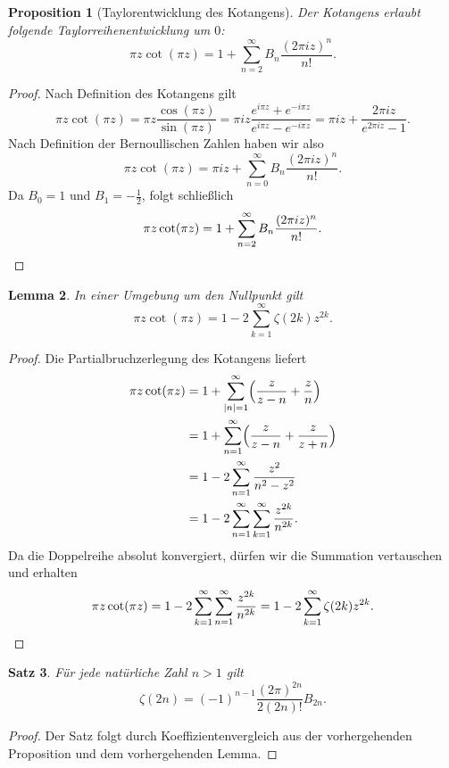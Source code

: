 \documentclass[a4paper,twoside,openright]{report}
\newtheorem{thm}{Satz}[chapter]
\newtheorem{prop}[thm]{Proposition}
\newtheorem{lem}[thm]{Lemma}
\theoremstyle{definition}
\theoremstyle{remark}
\begin{document}
\begin{prop}[Taylorentwicklung des Kotangens]
  Der Kotangens erlaubt folgende Taylorreihenentwicklung um $0$:
  \[
    \pi z \cot(\pi z) = 1 + \sum_{n = 2}^\infty B_n \frac{(2 \pi i z)^n}{n!}.
  \]
\end{prop}

\begin{proof}
  Nach Definition des Kotangens gilt
  \[
    \pi z \cot(\pi z) = \pi z \frac{\cos(\pi z)}{\sin (\pi z)}
    = \pi i z \frac{e^{i \pi z} + e^{- i \pi z}}{e^{i \pi z} - e^{- i \pi z}}
    = \pi i z + \frac{2 \pi i z}{e^{2 \pi i z} - 1}.
  \]
  Nach Definition der Bernoullischen Zahlen haben wir also
  \[
    \pi z \cot(\pi z) = \pi i z + \sum_{n = 0}^\infty B_n \frac{(2 \pi i z)^n}{n!}.
  \]
  Da $B_0 = 1$ und $B_1 = - \frac 1 2$, folgt schließlich
  \[
    \pi z \cot(\pi z) = 1 + \sum_{n = 2}^\infty B_n \frac{(2 \pi i z)^n}{n!}.
    \qedhere
  \]
\end{proof}

\begin{lem}
  In einer Umgebung um den Nullpunkt gilt
  \[
    \pi z \cot(\pi z) = 1 - 2 \sum_{k = 1}^\infty \zeta(2k) z^{2k}.
  \]
\end{lem}

\begin{proof}
  Die Partialbruchzerlegung des Kotangens liefert
  \[
    \begin{split}
      \pi z \cot(\pi z) & = 1 + \sum_{|n| = 1}^\infty \Bigl(\frac{z}{z - n} + \frac z n\Bigr)
      \\
      & = 1 + \sum_{n = 1}^\infty \Bigl(\frac{z} {z - n} + \frac z {z + n}\Bigr)
      \\
      & = 1 - 2 \sum_{n = 1}^\infty \frac{z^2}{n^2 - z^2}
      \\
      & = 1 - 2 \sum_{n = 1}^\infty \sum_{k = 1}^\infty \frac{z^{2k}}{n^{2k}}.
    \end{split}
  \]
  Da die Doppelreihe absolut konvergiert, dürfen wir die Summation vertauschen
  und erhalten
  \[
    \pi z \cot(\pi z) = 1 - 2 \sum_{k = 1}^\infty \sum_{n = 1}^\infty \frac{z^{2k}}{n^{2k}}
    = 1 - 2 \sum_{k = 1}^\infty \zeta(2k) z^{2k}.
    \qedhere
 \]
\end{proof}

\begin{thm}
  Für jede natürliche Zahl $n > 1$ gilt
  \[
    \zeta(2n) = (-1)^{n - 1} \frac{(2 \pi)^{2n}}{2 (2n)!} B_{2n}.
  \]
\end{thm}

\begin{proof}
  Der Satz folgt durch Koeffizientenvergleich aus der vorhergehenden Proposition
  und dem vorhergehenden Lemma.
\end{proof}
\end{document}
